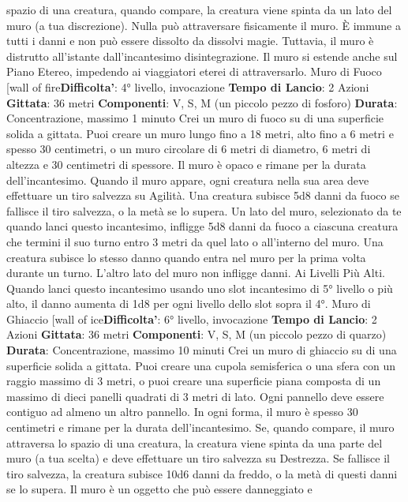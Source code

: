 \begin{multicols}{2}
spazio di una creatura, quando compare, la creatura
viene spinta da un lato del muro (a tua discrezione).
Nulla può attraversare fisicamente il muro. È immune a
tutti i danni e non può essere dissolto da dissolvi magie.
Tuttavia, il muro è distrutto all’istante dall’incantesimo
disintegrazione. Il muro si estende anche sul Piano
Etereo, impedendo ai viaggiatori eterei di attraversarlo.
Muro di Fuoco
[wall of fire\textbf{Difficolta'}:
4° livello, invocazione
\textbf{Tempo di Lancio}: 2 Azioni
\textbf{Gittata}: 36 metri
\textbf{Componenti}: V, S, M (un piccolo pezzo di fosforo)
\textbf{Durata}: Concentrazione, massimo 1 minuto
Crei un muro di fuoco su di una superficie solida a
gittata. Puoi creare un muro lungo fino a 18 metri, alto
fino a 6 metri e spesso 30 centimetri, o un muro
circolare di 6 metri di diametro, 6 metri di altezza e 30
centimetri di spessore. Il muro è opaco e rimane per la
durata dell’incantesimo.
Quando il muro appare, ogni creatura nella sua area
deve effettuare un tiro salvezza su Agilità. Una
creatura subisce 5d8 danni da fuoco se fallisce il tiro
salvezza, o la metà se lo supera.
Un lato del muro, selezionato da te quando lanci questo
incantesimo, infligge 5d8 danni da fuoco a ciascuna
creatura che termini il suo turno entro 3 metri da quel
lato o all’interno del muro. Una creatura subisce lo
stesso danno quando entra nel muro per la prima volta
durante un turno. L’altro lato del muro non infligge
danni.
Ai Livelli Più Alti. Quando lanci questo incantesimo
usando uno slot incantesimo di 5° livello o più alto, il
danno aumenta di 1d8 per ogni livello dello slot sopra il
4°.
Muro di Ghiaccio
[wall of ice\textbf{Difficolta'}:
6° livello, invocazione
\textbf{Tempo di Lancio}: 2 Azioni
\textbf{Gittata}: 36 metri
\textbf{Componenti}: V, S, M (un piccolo pezzo di quarzo)
\textbf{Durata}: Concentrazione, massimo 10 minuti
Crei un muro di ghiaccio su di una superficie solida a
gittata. Puoi creare una cupola semisferica o una sfera
con un raggio massimo di 3 metri, o puoi creare una
superficie piana composta di un massimo di dieci
panelli quadrati di 3 metri di lato. Ogni pannello deve
essere contiguo ad almeno un altro pannello. In ogni
forma, il muro è spesso 30 centimetri e rimane per la
durata dell’incantesimo.
Se, quando compare, il muro attraversa lo spazio di una
creatura, la creatura viene spinta da una parte del muro
(a tua scelta) e deve effettuare un tiro salvezza su
Destrezza. Se fallisce il tiro salvezza, la creatura
subisce 10d6 danni da freddo, o la metà di questi danni
se lo supera.
Il muro è un oggetto che può essere danneggiato e

\end{multicols}
